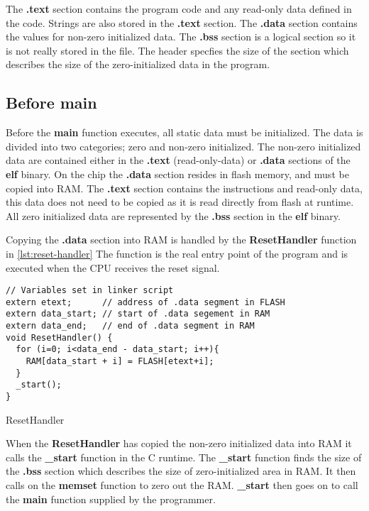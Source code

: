 The \textbf{.text} section contains the program code and any read-only data defined in the code.
Strings are also stored in the \textbf{.text} section.
The \textbf{.data} section contains the values for non-zero initialized data.
The \textbf{.bss} section is a logical section so it is not really stored in the file.
The header specfies the size of the section which describes the size of the zero-initialized data in the program.

\subsection{Before main}

Before the \textbf{main} function executes, all static data must be initialized.
The data is divided into two categories; zero and non-zero initialized.
The non-zero initialized data are contained either in the \textbf{.text} (read-only-data) or \textbf{.data} sections of the \textbf{elf} binary.
On the chip the \textbf{.data} section resides in flash memory, and must be copied into RAM.
The \textbf{.text} section contains the instructions and read-only data, this data does not need to be copied as it is read directly from flash at runtime.
All zero initialized data are represented by the \textbf{.bss} section in the \textbf{elf} binary.

Copying the \textbf{.data} section into RAM is handled by the \textbf{ResetHandler} function in \autoref{lst:reset-handler}
The function is the real entry point of the program and is executed when the CPU receives the reset signal.

\begin{listing}[H]
\begin{verbatim}
// Variables set in linker script
extern etext;      // address of .data segment in FLASH
extern data_start; // start of .data segement in RAM
extern data_end;   // end of .data segment in RAM
void ResetHandler() {
  for (i=0; i<data_end - data_start; i++){
    RAM[data_start + i] = FLASH[etext+i];
  }
  _start();
}
\end{verbatim}
\caption{ResetHandler}
\label{lst:reset-handler}
\end{listing}

When the \textbf{ResetHandler} has copied the non-zero initialized data into RAM it calls the \textbf{\_start} function in the C runtime.
The \textbf{\_start} function finds the size of the \textbf{.bss} section which describes the size of zero-initialized area in RAM.
It then calls on the \textbf{memset} function to zero out the RAM.
\textbf{\_start} then goes on to call the \textbf{main} function supplied by the programmer.

